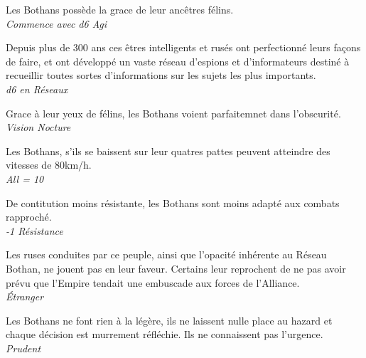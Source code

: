 \begin{description}[align=left]
\item [Agilité du Félin] 			%
		Les Bothans possède la grace de leur ancêtres félins.\\
		\emph{Commence avec d6 Agi}
\item [Service de renseignement] 	%
		Depuis plus de 300 ans ces êtres intelligents et rusés ont perfectionné leurs façons de faire, et ont développé un vaste réseau d'espions et d'informateurs destiné à recueillir toutes sortes d'informations sur les sujets les plus importants.\\
		\emph{d6 en Réseaux}
\item [Comme en plein jour] 		%
		Grace à leur yeux de félins, les Bothans voient parfaitemnet dans l'obscurité.\\
		\emph{Vision Nocture}
\item [Déplacement rapide] 			%
		Les Bothans, s'ils se baissent sur leur quatres pattes peuvent atteindre des vitesses de 80km/h.\\
		\emph{All = 10}
\item [Frêle] 						%
		De contitution moins résistante, les Bothans sont moins adapté aux combats rapproché.\\
		\emph{-1 Résistance}
\item [Mauvaise réputation] 		%
		Les ruses conduites par ce peuple, ainsi que l'opacité inhérente au Réseau Bothan, ne jouent pas en leur faveur. Certains leur reprochent de ne pas avoir prévu que l'Empire tendait une embuscade aux forces de l'Alliance.\\
		\emph{\'Etranger}
\item [Prudent] 					%
		Les Bothans ne font rien à la légère, ils ne laissent nulle place au hazard et chaque décision est murrement réfléchie. Ils ne connaissent pas l'urgence.\\
		\emph{Prudent}
\end{description}